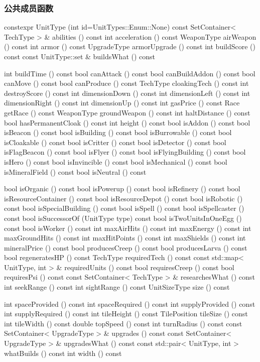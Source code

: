 \subsubsection{公共成员函数}
\begin{codebox}[公共成员函数]
constexpr UnitType (int id=UnitTypes::Enum::None)
const SetContainer< TechType > & abilities () const
int acceleration () const
WeaponType airWeapon () const
int armor () const
UpgradeType armorUpgrade () const
int buildScore () const
const UnitType::set & buildsWhat () const
\end{codebox}
\begin{codebox}[公共成员函数]
int buildTime () const
bool canAttack () const
bool canBuildAddon () const
bool canMove () const
bool canProduce () const
TechType cloakingTech () const
int destroyScore () const
int dimensionDown () const
int dimensionLeft () const
int dimensionRight () const
int dimensionUp () const
int gasPrice () const
Race getRace () const
WeaponType groundWeapon () const
int haltDistance () const
bool hasPermanentCloak () const
int height () const
bool isAddon () const
bool isBeacon () const
bool isBuilding () const
bool isBurrowable () const
bool isCloakable () const
bool isCritter () const
bool isDetector () const
bool isFlagBeacon () const
bool isFlyer () const
bool isFlyingBuilding () const
bool isHero () const
bool isInvincible () const
bool isMechanical () const
bool isMineralField () const
bool isNeutral () const
\end{codebox}
\begin{codebox}[公共成员函数]
bool isOrganic () const
bool isPowerup () const
bool isRefinery () const
bool isResourceContainer () const
bool isResourceDepot () const
bool isRobotic () const
bool isSpecialBuilding () const
bool isSpell () const
bool isSpellcaster () const
bool isSuccessorOf (UnitType type) const
bool isTwoUnitsInOneEgg () const
bool isWorker () const
int maxAirHits () const
int maxEnergy () const
int maxGroundHits () const
int maxHitPoints () const
int maxShields () const
int mineralPrice () const
bool producesCreep () const
bool producesLarva () const
bool regeneratesHP () const
TechType requiredTech () const
const std::map< UnitType, int > & requiredUnits () const
bool requiresCreep () const
bool requiresPsi () const
const SetContainer< TechType > & researchesWhat () const
int seekRange () const
int sightRange () const
UnitSizeType size () const
\end{codebox}
\begin{codebox}[公共成员函数]
int spaceProvided () const
int spaceRequired () const
int supplyProvided () const
int supplyRequired () const
int tileHeight () const
TilePosition tileSize () const
int tileWidth () const
double topSpeed () const
int turnRadius () const
const SetContainer< UpgradeType > & upgrades () const
const SetContainer< UpgradeType > & upgradesWhat () const
const std::pair< UnitType, int > whatBuilds () const
int width () const
\end{codebox}
